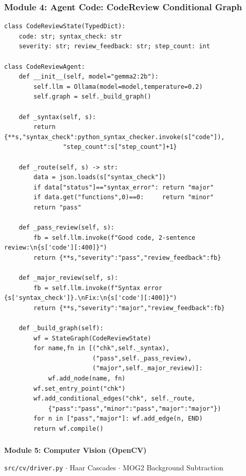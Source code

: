 \begin{frame}[fragile]\frametitle{Module 4: Agent Code: CodeReview Conditional Graph}
\begin{lstlisting}
class CodeReviewState(TypedDict):
    code: str; syntax_check: str
    severity: str; review_feedback: str; step_count: int

class CodeReviewAgent:
    def __init__(self, model="gemma2:2b"):
        self.llm = Ollama(model=model,temperature=0.2)
        self.graph = self._build_graph()

    def _syntax(self, s):
        return {**s,"syntax_check":python_syntax_checker.invoke(s["code"]),
                "step_count":s["step_count"]+1}

    def _route(self, s) -> str:
        data = json.loads(s["syntax_check"])
        if data["status"]=="syntax_error": return "major"
        if data.get("functions",0)==0:     return "minor"
        return "pass"

    def _pass_review(self, s):
        fb = self.llm.invoke(f"Good code, 2-sentence review:\n{s['code'][:400]}")
        return {**s,"severity":"pass","review_feedback":fb}

    def _major_review(self, s):
        fb = self.llm.invoke(f"Syntax error {s['syntax_check']}.\nFix:\n{s['code'][:400]}")
        return {**s,"severity":"major","review_feedback":fb}

    def _build_graph(self):
        wf = StateGraph(CodeReviewState)
        for name,fn in [("chk",self._syntax),
                        ("pass",self._pass_review),
                        ("major",self._major_review)]:
            wf.add_node(name, fn)
        wf.set_entry_point("chk")
        wf.add_conditional_edges("chk", self._route,
            {"pass":"pass","minor":"pass","major":"major"})
        for n in ["pass","major"]: wf.add_edge(n, END)
        return wf.compile()
\end{lstlisting}
\end{frame}

\begin{frame}[fragile]\frametitle{}
\begin{center}
{\Large \textbf{Module 5: Computer Vision (OpenCV)}}\

\texttt{src/cv/driver.py} $\cdot$ Haar Cascades $\cdot$ MOG2 Background Subtraction
\end{center}
\end{frame}

